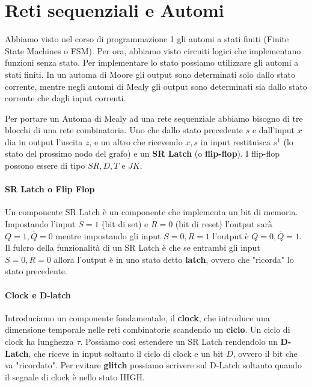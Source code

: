 \section{Reti sequenziali e Automi}

Abbiamo visto nel corso di programmazione 1 gli automi a stati finiti (Finite State Machines o FSM). Per ora, abbiamo visto circuiti logici che implementano funzioni senza stato. Per implementare lo stato possiamo utilizzare gli automi a stati finiti. In un automa di Moore gli output sono determinati solo dallo stato corrente, mentre negli automi di Mealy gli output sono determinati sia dallo stato corrente che dagli input correnti.


Per portare un Automa di Mealy ad una rete sequenziale abbiamo bisogno di tre blocchi di una rete combinatoria. Uno che dallo stato precedente $ s $ e dall'input $ x $ dia in output l'uscita $ z $, e un altro che ricevendo $ x,s $ in input restituisca $ s^1 $ (lo stato del prossimo nodo del grafo) e un \textbf{SR Latch} (o \textbf{flip-flop}). I flip-flop possono essere di tipo $ SR, D, T $ e $ JK $.
 

\paragraph{SR Latch o Flip Flop}

Un componente SR Latch è un componente che implementa un bit di memoria. Impostando l'input $ S=1 $ (bit di set) e $ R=0 $  (bit di reset) l'output sarà $ Q=1,\overbar{Q}=0 $ mentre impostando gli input $ S=0,R=1 $ l'output è $ Q=0,\overbar{Q}=1 $. Il fulcro della funzionalità di un SR Latch è che se entrambi gli input $ S=0,R=0 $ allora l'output è in uno stato detto \textbf{latch}, ovvero che "ricorda" lo stato precedente.


\paragraph{Clock e D-latch}

Introduciamo un componente fondamentale, il \textbf{clock}, che introduce una dimensione temporale nelle reti combinatorie scandendo un \textbf{ciclo}. Un ciclo di clock ha lunghezza $ \tau $. Possiamo così estendere un SR Latch rendendolo un \textbf{D-Latch}, che riceve in input soltanto il ciclo di clock e un bit $ D $, ovvero il bit che va "ricordato". Per evitare \textbf{glitch} possiamo scrivere sul D-Latch soltanto quando il segnale di clock è nello stato HIGH.

